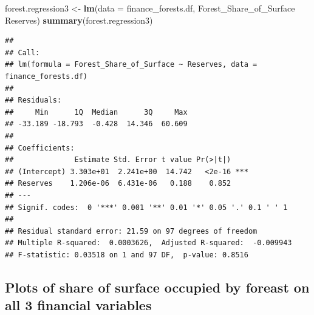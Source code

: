 \documentclass[
  12pt,
]{article}
\newenvironment{Shaded}{\begin{snugshade}}{\end{snugshade}}
\newcommand{\CommentTok}[1]{\textcolor[rgb]{0.56,0.35,0.01}{\textit{#1}}}
\newcommand{\DataTypeTok}[1]{\textcolor[rgb]{0.13,0.29,0.53}{#1}}
\newcommand{\DecValTok}[1]{\textcolor[rgb]{0.00,0.00,0.81}{#1}}
\newcommand{\FloatTok}[1]{\textcolor[rgb]{0.00,0.00,0.81}{#1}}
\newcommand{\KeywordTok}[1]{\textcolor[rgb]{0.13,0.29,0.53}{\textbf{#1}}}
\newcommand{\NormalTok}[1]{#1}
\newcommand{\OperatorTok}[1]{\textcolor[rgb]{0.81,0.36,0.00}{\textbf{#1}}}
\newcommand{\OtherTok}[1]{\textcolor[rgb]{0.56,0.35,0.01}{#1}}
\newcommand{\StringTok}[1]{\textcolor[rgb]{0.31,0.60,0.02}{#1}}
\begin{document}
\begin{Shaded}
\begin{Highlighting}[]
\NormalTok{forest.regression3 <-}\StringTok{ }\KeywordTok{lm}\NormalTok{(}\DataTypeTok{data =}\NormalTok{ finance_forests.df, Forest_Share_of_Surface }\OperatorTok{~}\StringTok{ }\NormalTok{Reserves)}
\KeywordTok{summary}\NormalTok{(forest.regression3)}
\end{Highlighting}
\end{Shaded}

\begin{verbatim}
## 
## Call:
## lm(formula = Forest_Share_of_Surface ~ Reserves, data = finance_forests.df)
## 
## Residuals:
##     Min      1Q  Median      3Q     Max 
## -33.189 -18.793  -0.428  14.346  60.609 
## 
## Coefficients:
##              Estimate Std. Error t value Pr(>|t|)    
## (Intercept) 3.303e+01  2.241e+00  14.742   <2e-16 ***
## Reserves    1.206e-06  6.431e-06   0.188    0.852    
## ---
## Signif. codes:  0 '***' 0.001 '**' 0.01 '*' 0.05 '.' 0.1 ' ' 1
## 
## Residual standard error: 21.59 on 97 degrees of freedom
## Multiple R-squared:  0.0003626,  Adjusted R-squared:  -0.009943 
## F-statistic: 0.03518 on 1 and 97 DF,  p-value: 0.8516
\end{verbatim}

\hypertarget{plots-of-share-of-surface-occupied-by-foreast-on-all-3-financial-variables}{%
\subsection{Plots of share of surface occupied by foreast on all 3
financial
variables}\label{plots-of-share-of-surface-occupied-by-foreast-on-all-3-financial-variables}}

\begin{Shaded}
\end{Shaded}
\end{document}
